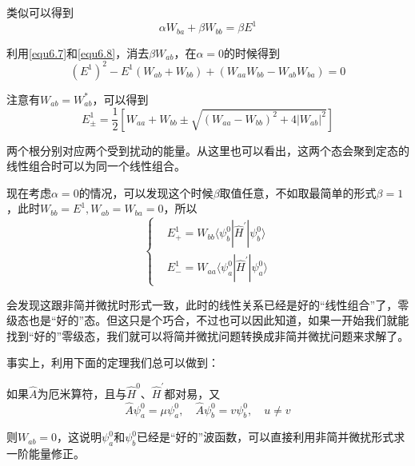 \documentclass[UTF8]{ctexart}
\begin{document}
    类似可以得到 
    \begin{equation}
        \alpha W_{ba} + \beta W_{bb} = \beta E^1 \label{equ6.8}
    \end{equation}

\noindent 利用\autoref{equ6.7}和\autoref{equ6.8}，消去$\beta W_{ab}$，在$\alpha = 0$的时候得到 
\begin{equation}
    (E^1)^2 - E^1 (W_{ab}+W_{bb}) + (W_{aa}W_{bb} - W_{ab}W_{ba}) = 0
\end{equation}

\noindent 注意有$W_{ab} = W_{ab}^*$，可以得到 
\begin{equation}
    E_{\pm}^{1} = \frac{1}{2} \left[W_{aa} + W_{bb} \pm \sqrt{(W_{aa}-W_{bb})^2 + 4|W_{ab}|^2}\right]
\end{equation}

\noindent 两个根分别对应两个受到扰动的能量。从这里也可以看出，这两个态会聚到定态的线性组合时可以为同一个线性组合。

    现在考虑$\alpha = 0$的情况，可以发现这个时候$\beta$取值任意，不如取最简单的形式$\beta = 1$，此时$W_{bb} = E^1,W_{ab}=W_{ba}=0$，所以 
    \begin{equation}
        \left \{ \begin{aligned}
            &E_+^1 = W_{bb} \langle \psi_b^0 | \hat{H}^{\prime} | \psi_b^0 \rangle \\
            &E_-^1 = W_{aa} \langle \psi_a^0 | \hat{H}^{\prime} | \psi_a^0 \rangle
        \end{aligned} \right.
    \end{equation}

\noindent 会发现这跟非简并微扰时形式一致，此时的线性关系已经是好的“线性组合”了，零级态也是“好的”态。但这只是个巧合，不过也可以因此知道，如果一开始我们就能找到“好的”零级态，我们就可以将简并微扰问题转换成非简并微扰问题来求解了。

    事实上，利用下面的定理我们总可以做到：

\noindent 如果$\hat{A}$为厄米算符，且与$\hat{H}^0$、$\hat{H}^{\prime}$都对易，又
\begin{equation}
    \hat{A} \psi_a^0 = \mu \psi_a^0, \quad \hat{A} \psi_b^0 = v \psi_b^0, \quad u \ne v
\end{equation}

\noindent 则$W_{ab}=0$，这说明$\psi_a^0$和$\psi_b^0$已经是“好的”波函数，可以直接利用非简并微扰形式求一阶能量修正。
\end{document}

